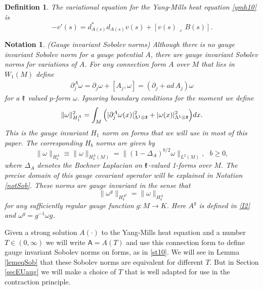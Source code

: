 \documentclass[12pt]{article}
\newtheorem{definition}[theorem]{Definition}
\newtheorem{notation}[theorem]{Notation}
\def \L{\Lambda}
\def \({\Big(}
\def \){\Big)}
\def \As{\mathsf{A}}
\def \w{\omega}
\def \kf{\frak k}
\def \p{\partial}
\def \beq{\begin{equation}}
\def \eeq{\end{equation}}
\def \eref{\eqref}
\def \lrc{\lrcorner\,}
\numberwithin{equation}{section}
\begin{document}
    \begin{definition} {\rm The {\it variational equation} for the Yang-Mills heat 
equation \eref{ymh10} is
\beq
-v'(s) = d_{A(s)}^* d_{A(s)} v(s) + [ v(s)\lrc B(s)].        \label{ve}
\eeq
}
\end{definition}
     \begin{notation} \label{notgisn}
{\rm (Gauge invariant Sobolev norms)     
Although there is no gauge invariant Sobolev norm for a gauge potential $A$,
there are gauge invariant Sobolev norms for variations of $A$. 
 For any connection form $A$ over $M$ that lies in $W_1(M)$ define
\begin{align}
\p_j^A \w =\p_j \w + [A_j, \w] = (\p_j + ad\, A_j)\w   \label{ps8}
\end{align}
for a $\kf$ valued $p$-form $\w$. 
Ignoring boundary conditions for the moment we define
\begin{align}
\|\w\|_{H_1^A}^2 = \int_M\( |\p_j^A \w(x)|_{\L^1\otimes \kf}^2 
       + | \w(x)|_{\L^1\otimes \kf}^2\)dx.                                             \label{st10}
\end{align}
This is the gauge invariant $H_1$ norm on forms that we will use in most of this paper.
The corresponding $H_b$ norms are given by 
\beq
     \|\w\|_{H_b^A} \equiv \|\w\|_{H_b^A(M)} = \| (1- \Delta_A)^{b/2}\w \|_{L^2(M)},\ \ \  b \ge 0,  \label{ST19}
     \eeq
 where  $\Delta_A$ denotes the Bochner Laplacian on $\kf$-valued 1-forms over $M$. 
 The precise domain of this gauge covariant operator will be explained in Notation  \ref{notSob}.
 These norms are gauge invariant in the sense that
      \beq
     \| \w^g \|_{H_b^{A^g}} = \|\w\|_{H_b^A}
     \eeq
for any sufficiently regular gauge function $g:M\rightarrow K$.   Here $A^g$ is defined in \eref{I2} and
$\w^g = g^{-1} \w g$. 
}
\end{notation}

Given a strong solution $A(\cdot)$ to the Yang-Mills heat equation  and a number $T \in (0, \infty)$
we will write $\As = A(T)$ and use this connection form to define gauge invariant Sobolev 
norms on forms, as in \eref{st10}.
We will see in Lemma  \ref{lemeqSob} that these Sobolev norms are equivalent for different $T$. But in Section \ref{secEUaug}
we will make a choice of  $T$ that is well adapted for use in the contraction principle.
\end{document}
